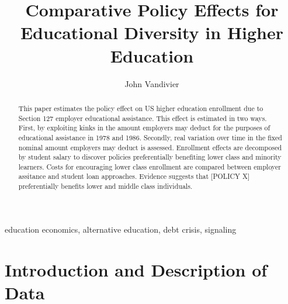 \documentclass[review]{elsarticle}
\begin{document}
\begin{frontmatter}

\title{
    Comparative Policy Effects for Educational Diversity in Higher Education
}
\tnotetext[titlenotes]{
}

\author[mymainaddress]{John Vandivier} %
\address[mymainaddress]{4400 University Dr, Fairfax, VA 22030}

\begin{abstract}
    This paper estimates the policy effect on US higher education enrollment due to Section 127 employer educational assistance.
    This effect is estimated in two ways.
    First, by exploiting kinks in the amount employers may deduct for the purposes of educational assistance in 1978 and 1986.
    Secondly, real variation over time in the fixed nominal amount employers may deduct is assessed.
    Enrollment effects are decomposed by student salary to discover policies preferentially benefiting lower class and minority learners.
    Costs for encouraging lower class enrollment are compared between employer assitance and student loan approaches.
    Evidence suggests that [POLICY X] preferentially benefits lower and middle class individuals.
\end{abstract}

\begin{keyword}
education economics, alternative education, debt crisis, signaling
\MSC[2010] %
\end{keyword}

\end{frontmatter}

\pagebreak
\linenumbers
        
        \section{Introduction and Description of Data}


\end{document}
